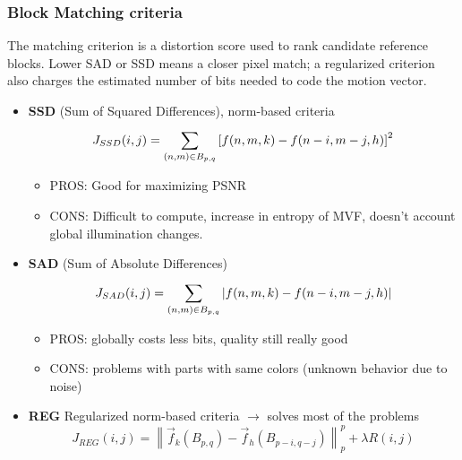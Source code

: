 \subsubsection{Block Matching criteria}
The matching criterion is a distortion score used to rank candidate reference blocks. Lower SAD or SSD means a closer pixel match; a regularized criterion also charges the estimated number of bits needed to code the motion vector.
\begin{itemize}
    \item \textbf{SSD} (Sum of Squared Differences), norm-based criteria $$J_{SSD}(i,j) = \sum_{(n,m)\in B_{p,q}}^{}\left[f(n,m,k) - f(n-i, m-j, h)\right]^2$$
    \begin{itemize}
        \item PROS: Good for maximizing PSNR
        \item CONS: Difficult to compute, increase in entropy of MVF, doesn't account global illumination changes.
    \end{itemize}
    \item \textbf{SAD} (Sum of Absolute Differences) $$J_{SAD}(i,j) = \sum_{(n,m)\in B_{p,q}}^{}\left|f(n,m,k) - f(n-i, m-j, h)\right|$$
    \begin{itemize}
        \item PROS: globally costs less bits, quality still really good
        \item CONS: problems with parts with same colors (unknown behavior due to noise)
    \end{itemize}
    \item \textbf{REG} Regularized norm-based criteria $\to$ solves most of the problems $$J_{REG}(i,j) = \left\|\vec{f}_k(B_{p,q}) - \vec{f}_h(B_{p-i,q-j})\right\|^p_p + \lambda R(i,j)$$
\end{itemize}

